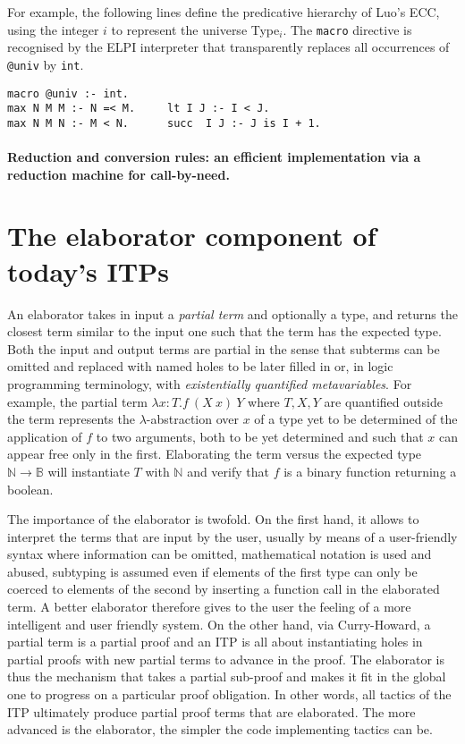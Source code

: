 \documentclass{easychair}
\begin{document}
For example, the following lines define the predicative hierarchy of Luo's ECC,
using the integer $i$ to represent the universe Type$_i$. The \verb+macro+
directive is recognised by the ELPI interpreter that transparently replaces all
occurrences of \verb+@univ+ by \verb+int+.
\begin{Verbatim}
macro @univ :- int.
max N M M :- N =< M.     lt I J :- I < J.
max N M N :- M < N.      succ  I J :- J is I + 1.
\end{Verbatim}

\paragraph{Reduction and conversion rules: an efficient implementation via a reduction machine for call-by-need.}\label{sec:kernelmachine}



\section{The elaborator component of today's ITPs}\label{sec:elaborator}

An elaborator takes in input a \emph{partial term} and optionally a
type, and returns the closest term similar to the input one such that
the term has the expected type. Both the input and output terms are
partial in the sense that subterms can be omitted and replaced with
named holes to be later filled in or, in logic programming
terminology, with \emph{existentially quantified metavariables}. For
example, the partial term $\lambda x: T. f~(X~x)~Y$ where $T,X,Y$ are
quantified outside the term represents the $\lambda$-abstraction over
$x$ of a type yet to be determined of the application of $f$ to two
arguments, both to be yet determined and such that $x$ can appear
free only in the first. Elaborating the term versus the expected type
$\mathbb{N} \to \mathbb{B}$ will instantiate $T$ with $\mathbb{N}$ and
verify that $f$ is a binary function returning a boolean.

The importance of the elaborator is twofold. On the first hand, it
allows to interpret the terms that are input by the user, usually by
means of a user-friendly syntax where information can be omitted,
mathematical notation is used and abused, subtyping is assumed even if
elements of the first type can only be coerced to elements of the
second by inserting a function call in the elaborated term. A better
elaborator therefore gives to the user the feeling of a more
intelligent and user friendly system. On the other hand, via
Curry-Howard, a partial term is a partial proof and an ITP is all
about instantiating holes in partial proofs with new partial terms to
advance in the proof. The elaborator is thus the mechanism that takes
a partial sub-proof and makes it fit in the global one to progress on
a particular proof obligation. In other words, all tactics of the ITP
ultimately produce partial proof terms that are elaborated. The more
advanced is the elaborator, the simpler the code implementing tactics
can be.
\end{document}
